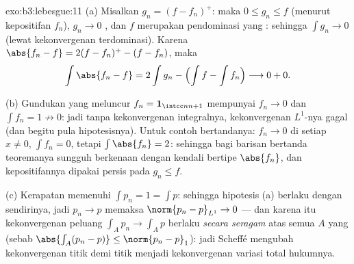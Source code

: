 \begin{solution}{exo:b3:lebesgue:11}
(a) Misalkan $g_n = (f - f_n)^+$: maka $0 \leq g_n \leq f$
(menurut kepositifan $f_n$), $g_n \to 0$ , dan $f$ merupakan
pendominasi yang : sehingga $\int g_n \to 0$ (lewat kekonvergenan terdominasi). Karena
$\abs{f_n - f} = 2(f - f_n)^+ - (f - f_n)$, maka
\[
\int\abs{f_n - f} = 2\int g_n - \Bigl(\int f - \int
f_n\Bigr) \longrightarrow 0 + 0 .
\]

(b) Gundukan yang meluncur $f_n = \mathbf 1_{\intcc n{n+1}}$ mempunyai
$f_n \to 0$  dan $\int f_n = 1 \not\to 0$: jadi tanpa
kekonvergenan integralnya, kekonvergenan $L^1$-nya gagal (dan begitu pula
hipotesisnya). Untuk contoh bertandanya: $f_n \to 0$ di
setiap $x \neq 0$, $\int f_n = 0$, tetapi $\int\abs{f_n} = 2$:
sehingga bagi barisan bertanda teoremanya sungguh berkenaan dengan
kendali bertipe $\abs{f_n}$, dan kepositifannya dipakai persis pada
$g_n \leq f$.

(c) Kerapatan memenuhi $\int p_n = 1 = \int p$: sehingga
hipotesis (a) berlaku dengan sendirinya, jadi $p_n \to p$  memaksa
$\norm{p_n - p}_{L^1} \to 0$ --- dan karena itu kekonvergenan
peluang $\int_Ap_n \to \int_Ap$ berlaku \emph{secara seragam}
atas semua $A$ yang  (sebab $\abs{\int_A(p_n - p)} \leq
\norm{p_n - p}_1$): jadi Scheffé mengubah kekonvergenan titik demi titik
 menjadi kekonvergenan variasi total hukumnya.
\end{solution}

